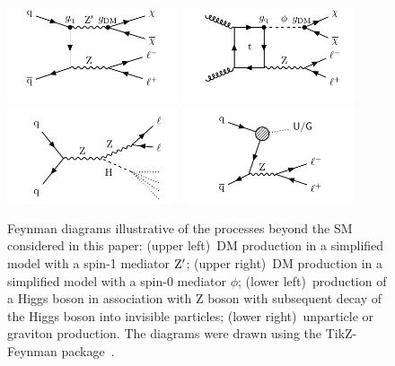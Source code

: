 \begin{figure}[!hbtp]
  \centering
    \includegraphics[width=0.45\textwidth]{figures/dmSimpFeynman.pdf}
    \includegraphics[width=0.45\textwidth]{figures/dmSimpFeynman_spin0.pdf}
    \includegraphics[width=0.45\textwidth]{figures/higgsInvisibleFeynman.pdf}
    \includegraphics[width=0.45\textwidth]{figures/graph_UG.pdf}
  \caption{Feynman diagrams illustrative of the processes beyond the SM considered in this paper:
    (upper left)~DM production in a simplified model with a spin-1 mediator $\mathrm{Z}'$;
    (upper right)~DM production in a simplified model with a spin-0 mediator $\phi$;
    (lower left)~production of a Higgs boson in association with Z boson with subsequent decay of the Higgs boson into invisible particles;
    (lower right)~unparticle or graviton production. The diagrams were drawn using the {\sc TikZ-Feynman} package~\cite{Ellis:2016jkw}.
  } 
      \label{fig:Feynman}
\end{figure}


